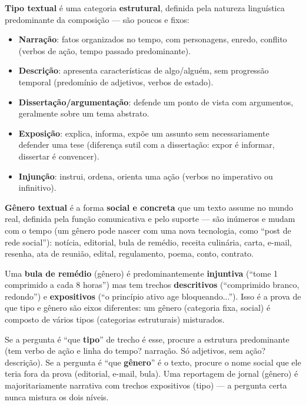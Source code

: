\begin{conceito}
\textbf{Tipo textual} é uma categoria \textbf{estrutural}, definida pela
natureza linguística predominante da composição --- são poucos e fixos:

\begin{itemize}
\item \textbf{Narração}: fatos organizados no tempo, com personagens, enredo,
conflito (verbos de ação, tempo passado predominante).
\item \textbf{Descrição}: apresenta características de algo/alguém, sem
progressão temporal (predomínio de adjetivos, verbos de estado).
\item \textbf{Dissertação/argumentação}: defende um ponto de vista com
argumentos, geralmente sobre um tema abstrato.
\item \textbf{Exposição}: explica, informa, expõe um assunto sem
necessariamente defender uma tese (diferença sutil com a dissertação: expor é
informar, dissertar é convencer).
\item \textbf{Injunção}: instrui, ordena, orienta uma ação (verbos no
imperativo ou infinitivo).
\end{itemize}

\textbf{Gênero textual} é a forma \textbf{social e concreta} que um texto
assume no mundo real, definida pela função comunicativa e pelo suporte ---
são inúmeros e mudam com o tempo (um gênero pode nascer com uma nova
tecnologia, como “post de rede social”): notícia, editorial, bula de remédio,
receita culinária, carta, e-mail, resenha, ata de reunião, edital,
regulamento, poema, conto, contrato.
\end{conceito}

\begin{exemplo}
Uma \textbf{bula de remédio} (gênero) é predominantemente \textbf{injuntiva}
(“tome 1 comprimido a cada 8 horas”) mas tem trechos \textbf{descritivos}
(“comprimido branco, redondo”) e \textbf{expositivos} (“o princípio ativo age
bloqueando...”). Isso é a prova de que tipo e gênero são eixos diferentes: um
gênero (categoria fixa, social) é composto de vários tipos (categorias
estruturais) misturados.
\end{exemplo}

\begin{regrapratica}
Se a pergunta é “que \textbf{tipo}” de trecho é esse, procure a estrutura
predominante (tem verbo de ação e linha do tempo? narração. Só adjetivos,
sem ação? descrição). Se a pergunta é “que \textbf{gênero}” é o texto,
procure o nome social que ele teria fora da prova (editorial, e-mail, bula).
Uma reportagem de jornal (gênero) é majoritariamente narrativa com trechos
expositivos (tipo) --- a pergunta certa nunca mistura os dois níveis.
\end{regrapratica}

